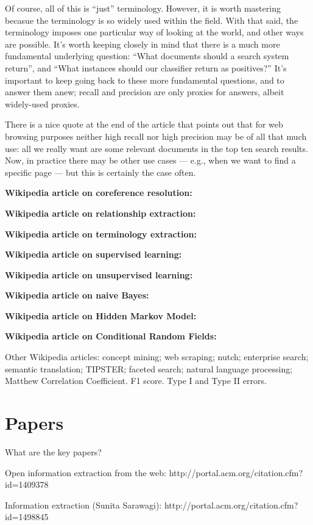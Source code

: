 Of course, all of this is ``just'' terminology.  However, it is worth
mastering becasue the terminology is so widely used within the field.
With that said, the terminology imposes one particular way of looking
at the world, and other ways are possible.  It's worth keeping closely
in mind that there is a much more fundamental underlying question:
``What documents should a search system return'', and ``What instances
should our classifier return as positives?''  It's important to keep
going back to these more fundamental questions, and to answer them
anew; recall and precision are only proxies for answers, albeit
widely-used proxies.

There is a nice quote at the end of the article that points out that
for web browsing purposes neither high recall nor high precision may
be of all that much use: all we really want are some relevant
documents in the top ten search results.  Now, in practice there may
be other use cases --- e.g., when we want to find a specific page ---
but this is certainly the case often.

\textbf{Wikipedia article on coreference resolution:}

\textbf{Wikipedia article on relationship extraction:}

\textbf{Wikipedia article on terminology extraction:}

\textbf{Wikipedia article on supervised learning:}

\textbf{Wikipedia article on unsupervised learning:}

\textbf{Wikipedia article on naive Bayes:}

\textbf{Wikipedia article on Hidden Markov Model:}

\textbf{Wikipedia article on Conditional Random Fields:}

Other Wikipedia articles: concept mining; web scraping; nutch;
enterprise search; semantic translation; TIPSTER; faceted search;
natural language processing; Matthew Correlation Coefficient. F1
score.  Type I and Type II errors.

\section{Papers}

What are the key papers?

Open information extraction from the web:
http://portal.acm.org/citation.cfm?id=1409378

Information extraction (Sunita Sarawagi):
http://portal.acm.org/citation.cfm?id=1498845


